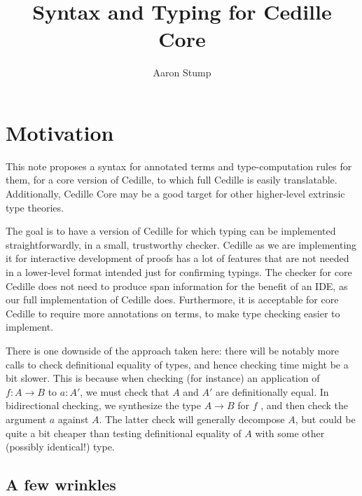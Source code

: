 \documentclass{article}
\begin{document}
\newcommand{\interp}[1]{\llbracket #1 \rrbracket} 
\newtheorem{theorem}{Theorem}
\newtheorem{lemma}[theorem]{Lemma}
\newtheorem{definition}[theorem]{Definition}
\newtheorem{corollary}[theorem]{Corollary}

\title{Syntax and Typing for Cedille Core}

\author{Aaron Stump}

\maketitle

\section{Motivation}

This note proposes a syntax for annotated terms and type-computation
rules for them, for a core version of Cedille, to which full Cedille
is easily translatable.  Additionally, Cedille Core may be a good target
for other higher-level extrinsic type theories.

The goal is to have a version of Cedille for which typing can be
implemented straightforwardly, in a small, trustworthy checker.
Cedille as we are implementing it for interactive development of
proofs has a lot of features that are not needed in a lower-level
format intended just for confirming typings.  The checker for core
Cedille does not need to produce span information for the benefit of
an IDE, as our full implementation of Cedille does.  Furthermore, it
is acceptable for core Cedille to require more annotations on terms,
to make type checking easier to implement.

There is one downside of the approach taken here: there will be
notably more calls to check definitional equality of types, and hence
checking time might be a bit slower.  This is because when checking
(for instance) an application of $f : A \to B$ to $a : A'$, we must
check that $A$ and $A'$ are definitionally equal.  In bidirectional
checking, we synthesize the type $A \to B$ for $f$ , and then check
the argument $a$ against $A$.  The latter check will generally
decompose $A$, but could be quite a bit cheaper than testing
definitional equality of $A$ with some other (possibly identical!)
type.

\subsection{A few wrinkles}
\end{document}
